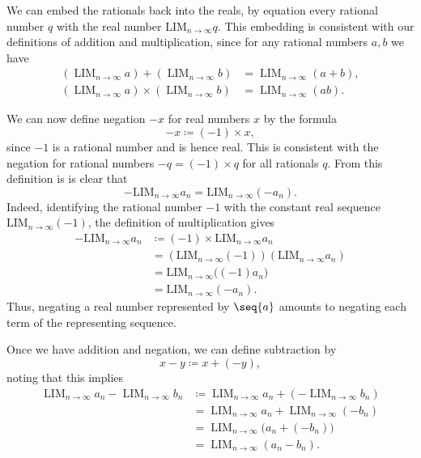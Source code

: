 {We can embed the rationals back into the reals, by equation every rational number $q$ with the real number $\text{LIM}_{n \to \infty} q$.
This embedding is consistent with our definitions of addition and multiplication, since for any rational numbers $a,b$ we have
\begin{align*}
\left(\operatorname{LIM}_{n\to\infty} a\right)
+
\left(\operatorname{LIM}_{n\to\infty} b\right)
&=
\operatorname{LIM}_{n\to\infty}(a+b), \\
\left(\operatorname{LIM}_{n\to\infty} a\right)
\times
\left(\operatorname{LIM}_{n\to\infty} b\right)
&=
\operatorname{LIM}_{n\to\infty}(ab).
\end{align*}

We can now define negation $-x$ for real numbers $x$ by the formula
\begin{equation*}
    -x \coloneqq (-1) \times x,
\end{equation*}
since $-1$ is a rational number and is hence real. This is consistent with the negation for rational numbers $-q=(-1)\times q$ for all rationals $q$. From this definition is is clear that
\begin{equation*}
    - \text{LIM}_{n \to \infty} a_n = \text{LIM}_{n \to \infty} (-a_n).
\end{equation*}
Indeed, identifying the rational number $-1$ with the constant real sequence
$\text{LIM}_{n\to\infty}(-1)$, the definition of multiplication gives
\begin{align*}
-\text{LIM}_{n\to\infty}a_n
&\coloneqq (-1)\times \text{LIM}_{n\to\infty}a_n \\
&=\left(\text{LIM}_{n\to\infty}(-1)\right)
  \left(\text{LIM}_{n\to\infty}a_n\right) \\
&=\text{LIM}_{n\to\infty}\bigl((-1)a_n\bigr) \\
&=\text{LIM}_{n\to\infty}(-a_n).
\end{align*}
Thus, negating a real number represented by $\seq{a}$ amounts to negating
each term of the representing sequence.

Once we have addition and negation, we can define subtraction by
\begin{equation*}
    x-y \coloneqq x+(-y),
\end{equation*}
noting that this implies
\begin{align*}
\operatorname{LIM}_{n\to\infty} a_n
-
\operatorname{LIM}_{n\to\infty} b_n
&\coloneqq
\operatorname{LIM}_{n\to\infty} a_n
+
\left(
-\operatorname{LIM}_{n\to\infty} b_n
\right) \\
&=
\operatorname{LIM}_{n\to\infty} a_n
+
\operatorname{LIM}_{n\to\infty}(-b_n) \\
&=
\operatorname{LIM}_{n\to\infty}
\bigl(a_n+(-b_n)\bigr) \\
&=
\operatorname{LIM}_{n\to\infty}(a_n-b_n).
\end{align*}

}
